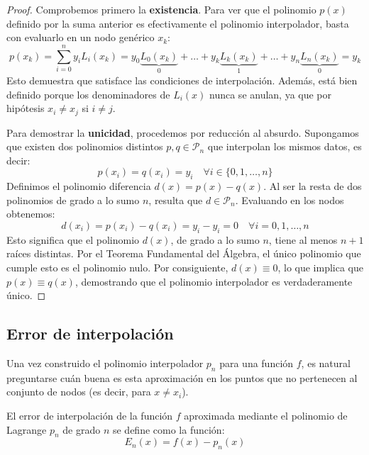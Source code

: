 \begin{proof}
    Comprobemos primero la \textbf{existencia}. Para ver que el polinomio $p(x)$ definido por la suma anterior es efectivamente el polinomio interpolador, basta con evaluarlo en un nodo genérico $x_k$:
    \[
        p(x_k) = \sum_{i=0}^n y_i L_i(x_k) = y_0 \underbrace{L_0(x_k)}_{0} + \ldots + y_k \underbrace{L_k(x_k)}_{1} + \ldots + y_n \underbrace{L_n(x_k)}_{0} = y_k
    \]
    Esto demuestra que satisface las condiciones de interpolación. Además, está bien definido porque los denominadores de $L_i(x)$ nunca se anulan, ya que por hipótesis $x_i \neq x_j$ si $i \neq j$.

    Para demostrar la \textbf{unicidad}, procedemos por reducción al absurdo. Supongamos que existen dos polinomios distintos $p, q \in \mathcal{P}_n$ que interpolan los mismos datos, es decir:
    \[
        p(x_i) = q(x_i) = y_i \quad \forall i \in \{0, 1, \ldots, n\}
    \]
    Definimos el polinomio diferencia $d(x) = p(x) - q(x)$. Al ser la resta de dos polinomios de grado a lo sumo $n$, resulta que $d \in \mathcal{P}_n$. Evaluando en los nodos obtenemos:
    \[
        d(x_i) = p(x_i) - q(x_i) = y_i - y_i = 0 \quad \forall i = 0, 1, \ldots, n
    \]
    Esto significa que el polinomio $d(x)$, de grado a lo sumo $n$, tiene al menos $n+1$ raíces distintas. Por el Teorema Fundamental del Álgebra, el único polinomio que cumple esto es el polinomio nulo. Por consiguiente, $d(x) \equiv 0$, lo que implica que $p(x) \equiv q(x)$, demostrando que el polinomio interpolador es verdaderamente único.
\end{proof}

\subsection{Error de interpolación}

Una vez construido el polinomio interpolador $p_n$ para una función $f$, es natural preguntarse cuán buena es esta aproximación en los puntos que no pertenecen al conjunto de nodos (es decir, para $x \neq x_i$).

\begin{definición}
    El error de interpolación de la función $f$ aproximada mediante el polinomio de Lagrange $p_n$ de grado $n$ se define como la función:
    \[
        E_n(x) = f(x) - p_n(x)
    \]
\end{definición}

